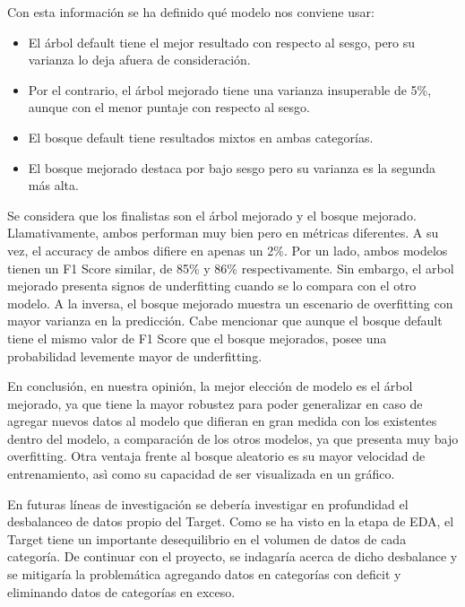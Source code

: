 \documentclass[a4paper]{article}
\begin{document}
    Con esta información se ha definido qué modelo nos conviene usar:
    \begin{itemize}
        \item El árbol default tiene el mejor resultado con respecto al sesgo, pero su varianza lo deja afuera de consideración.
        \item Por el contrario, el árbol mejorado tiene una varianza insuperable de 5\%, aunque con el menor puntaje con respecto al sesgo.
        \item El bosque default tiene resultados mixtos en ambas categorías.
        \item El bosque mejorado destaca por bajo sesgo pero su varianza es la segunda más alta.
    \end{itemize}
    
    Se considera que los finalistas son el árbol mejorado y el bosque mejorado. Llamativamente, ambos performan muy bien pero en métricas diferentes. A su vez, el accuracy de ambos difiere en apenas un 2\%. Por un lado, ambos modelos tienen un F1 Score similar, de 85\% y 86\% respectivamente. Sin embargo, el arbol mejorado presenta signos de underfitting cuando se lo compara con el otro modelo. A la inversa, el bosque mejorado muestra un escenario de overfitting con mayor varianza en la predicción. Cabe mencionar que aunque el bosque default tiene el mismo valor de F1 Score que el bosque mejorados, posee una probabilidad levemente mayor de underfitting. 
    
    En conclusión, en nuestra opinión, la mejor elección de modelo es el árbol mejorado, ya que tiene la mayor robustez  para poder generalizar en caso de agregar nuevos datos al modelo que difieran en gran medida con los existentes dentro del modelo, a comparación de los otros modelos, ya que presenta muy bajo overfitting. Otra ventaja frente al bosque aleatorio es su mayor velocidad de entrenamiento, asì como su capacidad de ser visualizada en un gráfico.

    En futuras líneas de investigación se debería investigar en profundidad el desbalanceo de datos propio del Target. Como se ha visto en la etapa de EDA, el Target tiene un importante desequilibrio en el volumen de datos de cada categoría. De continuar con el proyecto, se indagaría acerca de dicho desbalance y se mitigaría la problemática agregando datos en categorías con deficit y eliminando datos de categorías en exceso.

    
    
\end{document}
